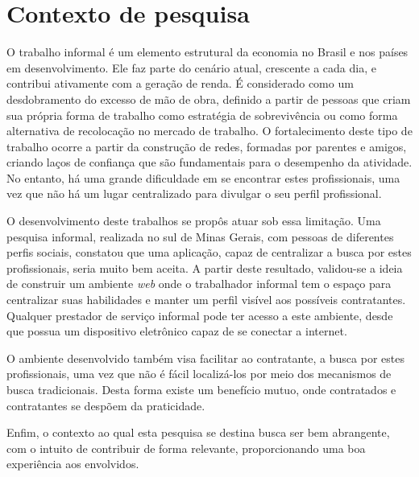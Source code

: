 \section{Contexto de pesquisa}
\par O trabalho informal é um elemento estrutural da economia no Brasil e nos países em desenvolvimento. Ele faz parte do cenário atual, crescente a cada dia, e contribui ativamente com a geração de renda. É considerado como um desdobramento do excesso de mão de obra, definido a partir de pessoas que criam sua própria forma de trabalho como estratégia de sobrevivência ou como forma alternativa de recolocação no mercado de trabalho. O fortalecimento deste tipo de trabalho ocorre a partir da construção de redes, formadas por parentes e amigos, criando laços de confiança que são fundamentais para o desempenho da atividade. No entanto, há uma grande dificuldade em se encontrar estes profissionais, uma vez que não há um lugar centralizado para divulgar o seu perfil profissional.

\par O desenvolvimento deste trabalhos se propôs atuar sob essa limitação. Uma pesquisa informal, realizada no sul de Minas Gerais, com pessoas de diferentes perfis sociais, constatou que uma aplicação, capaz de centralizar a busca por estes profissionais, seria muito bem aceita. A partir deste resultado, validou-se a ideia de construir um ambiente \textit{web} onde o trabalhador informal tem o espaço para centralizar suas habilidades e manter um perfil visível aos possíveis contratantes. Qualquer prestador de serviço informal pode ter acesso a este ambiente, desde que possua um dispositivo eletrônico capaz de se conectar a internet. 

\par O ambiente desenvolvido também visa facilitar ao contratante, a busca por estes profissionais, uma vez que não é fácil localizá-los por meio dos mecanismos de busca tradicionais. Desta forma existe um benefício mutuo, onde contratados e contratantes se despõem da praticidade.

\par Enfim, o contexto ao qual esta pesquisa se destina busca ser bem abrangente, com o intuito de contribuir de forma relevante, proporcionando uma boa experiência aos envolvidos.
 

